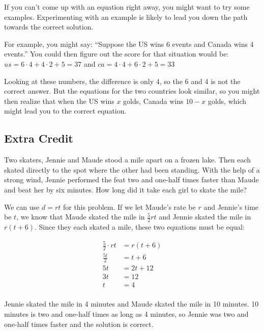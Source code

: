 \documentclass[letterpaper, landscape]{exam}
\begin{document}
\begin{questions}
\begin{solution}
        If you can't come up with an equation right away, you might want to try
        some examples.  Experimenting with an example is likely to lead you down
        the path towards the correct solution.

        For example, you might say:  ``Suppose the US wins 6 events and Canada
        wins 4 events.''  You could then figure out the score for that situation
        would be: $us = 6 \cdot 4 + 4 \cdot 2 + 5 = 37$ and 
        $ca = 4 \cdot 4 + 6 \cdot 2 + 5 = 33$

        Looking at these numbers, the difference is only 4, so the 6 and 4 is not
        the correct answer.  But the equations for the two countries look
        similar, so you might then realize that when the US wins $x$ golds,
        Canada wins $10 - x$ golds, which might lead you to the correct equation.
         
      \end{solution}

    \subsection{Extra Credit}

    \question[10]
      Two skaters, Jennie and Maude stood a mile apart on a frozen lake.  Then
      each skated directly to the spot where the other had been standing.  With
      the help of a strong wind, Jennie performed the feat two and one-half
      times faster than Maude and beat her by six minutes.  How long did it
      take each girl to skate the mile?

      \begin{solution}
        We can use $d = rt$ for this problem.  If we let Maude's rate be $r$ and
        Jennie's time be $t$, we know that Maude skated the mile in $\frac{5}{2}
        rt$ and Jennie skated the mile in $r(t + 6)$.  Since they each skated a
        mile, these two equations must be equal:

        \begin{align*}
          \frac{5}{2} \cdot rt & = r(t + 6) \\
          \frac{5t}{2}         & = t + 6 \\
          5t                   & = 2t + 12 \\
          3t                   & = 12 \\
          t                    & = 4 \\
        \end{align*}

        Jennie skated the mile in 4 minutes and Maude skated the mile in 10
        minutes.  10 minutes is two and one-half times as long as 4 minutes, so
        Jennie was two and one-half times faster and the solution is correct.

      \end{solution}
  \end{questions}
\end{document}
